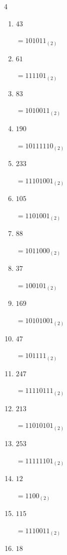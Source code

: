 \begin{multicols}{4}
\begin{enumerate}
        $=10000010_{(2)}$

  \item $43$

        $=101011_{(2)}$

  \item $61$

        $=111101_{(2)}$

  \item $83$

        $=1010011_{(2)}$

  \item $190$

        $=10111110_{(2)}$

  \item $233$

        $=11101001_{(2)}$

  \item $105$

        $=1101001_{(2)}$

  \item $88$

        $=1011000_{(2)}$

  \item $37$

        $=100101_{(2)}$

  \item $169$

        $=10101001_{(2)}$

  \item $47$

        $=101111_{(2)}$

  \item $247$

        $=11110111_{(2)}$

  \item $213$

        $=11010101_{(2)}$

  \item $253$

        $=11111101_{(2)}$

\columnbreak %

\resetques

  \item $12$

        $=1100_{(2)}$

  \item $115$

        $=1110011_{(2)}$

  \item $18$


\end{enumerate}
\end{multicols}
